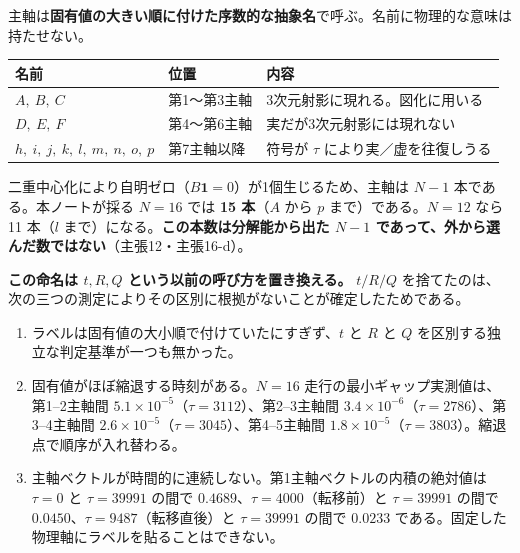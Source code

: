 \documentclass[
  10pt,
]{ltjsarticle}
\newcounter{none} %
\providecommand{\tightlist}{%
  \setlength{\itemsep}{0pt}\setlength{\parskip}{0pt}}
\begin{document}
主軸は\textbf{固有値の大きい順に付けた序数的な抽象名}で呼ぶ。名前に物理的な意味は持たせない。

{\def\LTcaptype{none} %
\begin{longtable}[]{@{}
  >{\raggedright\arraybackslash}p{}
  >{\raggedright\arraybackslash}p{}
  >{\raggedright\arraybackslash}p{}@{}}
\toprule\noalign{}
\begin{minipage}[b]{\linewidth}\raggedright
名前
\end{minipage} & \begin{minipage}[b]{\linewidth}\raggedright
位置
\end{minipage} & \begin{minipage}[b]{\linewidth}\raggedright
内容
\end{minipage} \\
\midrule\noalign{}
\endhead
\bottomrule\noalign{}
\endlastfoot
\(A,\ B,\ C\) & 第1〜第3主軸 & 3次元射影に現れる。図化に用いる \\
\(D,\ E,\ F\) & 第4〜第6主軸 & 実だが3次元射影には現れない \\
\(h,\ i,\ j,\ k,\ l,\ m,\ n,\ o,\ p\) & 第7主軸以降 & 符号が \(\tau\)
により実／虚を往復しうる \\
\end{longtable}
}

二重中心化により自明ゼロ（\(B\mathbf{1} = 0\)）が1個生じるため、主軸は
\(N-1\) 本である。本ノートが採る \(N = 16\) では \textbf{15 本}（\(A\)
から \(p\) まで）である。\(N=12\) なら 11 本（\(l\)
まで）になる。\textbf{この本数は分解能から出た \(N-1\)
であって、外から選んだ数ではない}（主張12・主張16-d）。

\textbf{この命名は \(t, R, Q\) という以前の呼び方を置き換える。}
\(t/R/Q\)
を捨てたのは、次の三つの測定によりその区別に根拠がないことが確定したためである。

\begin{enumerate}
\def\labelenumi{\arabic{enumi}.}
\tightlist
\item
  ラベルは固有値の大小順で付けていたにすぎず、\(t\) と \(R\) と \(Q\)
  を区別する独立な判定基準が一つも無かった。
\item
  固有値がほぼ縮退する時刻がある。\(N=16\)
  走行の最小ギャップ実測値は、第1--2主軸間
  \(5.1\times10^{-5}\)（\(\tau = 3112\)）、第2--3主軸間
  \(3.4\times10^{-6}\)（\(\tau = 2786\)）、第3--4主軸間
  \(2.6\times10^{-5}\)（\(\tau = 3045\)）、第4--5主軸間
  \(1.8\times10^{-5}\)（\(\tau = 3803\)）。縮退点で順序が入れ替わる。
\item
  主軸ベクトルが時間的に連続しない。第1主軸ベクトルの内積の絶対値は
  \(\tau = 0\) と \(\tau = 39991\) の間で
  \(0.4689\)、\(\tau = 4000\)（転移前）と \(\tau = 39991\) の間で
  \(0.0450\)、\(\tau = 9487\)（転移直後）と \(\tau = 39991\) の間で
  \(0.0233\) である。固定した物理軸にラベルを貼ることはできない。
\end{enumerate}
\end{document}
